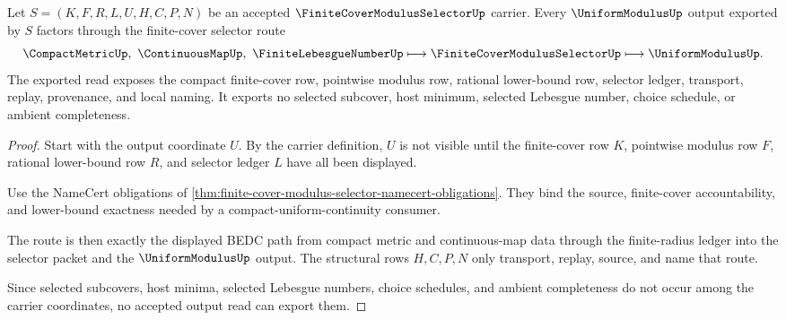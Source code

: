 \begin{theorem}
\label{thm:finite-cover-modulus-selector-uniform-output}
Let $S=(K,F,R,L,U,H,C,P,N)$ be an accepted $\FiniteCoverModulusSelectorUp$ carrier. Every $\UniformModulusUp$ output exported by $S$ factors through the finite-cover selector route
$$
\CompactMetricUp,\ \ContinuousMapUp,\ \FiniteLebesgueNumberUp
\longmapsto
\FiniteCoverModulusSelectorUp
\longmapsto
\UniformModulusUp .
$$
The exported read exposes the compact finite-cover row, pointwise modulus row, rational lower-bound row, selector ledger, transport, replay, provenance, and local naming. It exports no selected subcover, host minimum, selected Lebesgue number, choice schedule, or ambient completeness.
\end{theorem}
\begin{proof}
Start with the output coordinate $U$. By the carrier definition, $U$ is not visible until the finite-cover row $K$, pointwise modulus row $F$, rational lower-bound row $R$, and selector ledger $L$ have all been displayed.

Use the NameCert obligations of \autoref{thm:finite-cover-modulus-selector-namecert-obligations}. They bind the source, finite-cover accountability, and lower-bound exactness needed by a compact-uniform-continuity consumer.

The route is then exactly the displayed BEDC path from compact metric and continuous-map data through the finite-radius ledger into the selector packet and the $\UniformModulusUp$ output. The structural rows $H,C,P,N$ only transport, replay, source, and name that route.

Since selected subcovers, host minima, selected Lebesgue numbers, choice schedules, and ambient completeness do not occur among the carrier coordinates, no accepted output read can export them.
\end{proof}


\begin{closurestatus}{\FiniteCoverModulusSelectorUp}
  \theoryclosure{\seedClosure}
  \formalstatus{\unformalizedV}
\end{closurestatus}
